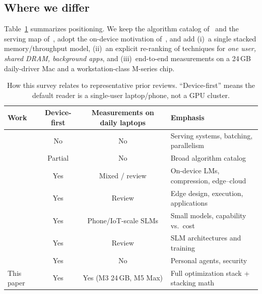 \subsection{Where we differ}

Table~\ref{tab:surveys} summarizes positioning. We keep the algorithm catalog of~\citet{lin2024qwq} and the serving map of~\citet{miao2023survey}, adopt the on-device motivation of~\citet{xu2024ondevice,lu2024slm}, and add (i)~a single stacked memory/throughput model, (ii)~an explicit re-ranking of techniques for \emph{one user, shared DRAM, background apps}, and (iii)~end-to-end measurements on a 24\,GB daily-driver Mac and a workstation-class M-series chip.

\begin{table}[t]
  \centering
  \small
  \caption{How this survey relates to representative prior reviews. ``Device-first'' means the default reader is a single-user laptop/phone, not a GPU cluster.}
  \label{tab:surveys}
  \begin{tabularx}{\textwidth}{@{}>{\raggedright\arraybackslash}p{3.2cm}ccX@{}}
    \toprule
    Work & Device-first & Measurements on daily laptops & Emphasis \\
    \midrule
    \citet{miao2023survey} & No & No & Serving systems, batching, parallelism \\
    \citet{lin2024qwq} & Partial & No & Broad algorithm catalog \\
    \citet{xu2024ondevice} & Yes & Mixed / review & On-device LMs, compression, edge--cloud \\
    \citet{qu2025edge} & Yes & Review & Edge design, execution, applications \\
    \citet{lu2024slm} & Yes & Phone/IoT-scale SLMs & Small models, capability vs.\ cost \\
    \citet{van2024surveyslm} & Yes & Review & SLM architectures and training \\
    \citet{chen2024personal} & Yes & No & Personal agents, security \\
    This paper & Yes & Yes (M3 24\,GB, M5 Max) & Full optimization stack + stacking math \\
    \bottomrule
  \end{tabularx}
\end{table}
